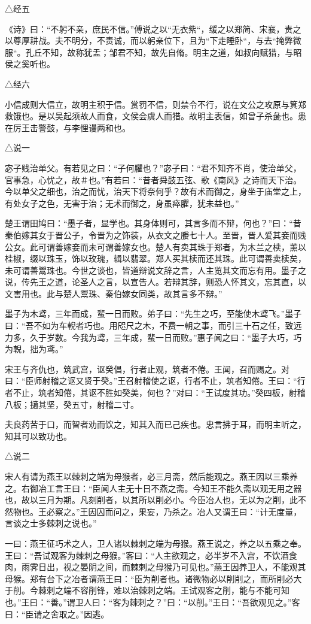 \documentclass[]{article}
\begin{document}
△经五

《诗》曰：``不躬不亲，庶民不信。''傅说之以``无衣紫``，缓之以郑简、宋襄，责之以尊厚耕战。夫不明分，不责诚，而以躬亲位下，且为``下走睡卧``，与去``掩弊微服``。孔丘不知，故称犹盂；邹君不知，故先自脩。明主之道，如叔向赋猎，与昭侯之奚听也。

△经六

小信成则大信立，故明主积于信。赏罚不信，则禁令不行，说在文公之攻原与箕郑救饿也。是以吴起须故人而食，文侯会虞人而猎。故明主表信，如曾子杀彘也。患在厉王击警鼓，与李悝谩两和也。

△说一

宓子贱治单父。有若见之曰：``子何臞也？''宓子曰：``君不知齐不肖，使治单父，官事急，心忧之，故＃也。''有若曰：``昔者舜鼓五弦、歌《南风》之诗而天下治。今以单父之细也，治之而忧，治天下将奈何乎？故有术而御之，身坐于庙堂之上，有处女子之色，无害于治；无术而御之，身虽瘁臞，犹未益也。''

楚王谓田鸠曰：``墨子者，显学也。其身体则可，其言多而不辩，何也？''曰：``昔秦伯嫁其女于晋公子，令晋为之饰装，从衣文之媵七十人。至晋，晋人爱其妾而贱公女。此可谓善嫁妾而未可谓善嫁女也。楚人有卖其珠于郑者，为木兰之椟，薰以桂椒，缀以珠玉，饰以玫瑰，辑以翡翠。郑人买其椟而还其珠。此可谓善卖椟矣，未可谓善鬻珠也。今世之谈也，皆道辩说文辞之言，人主览其文而忘有用。墨子之说，传先王之道，论圣人之言，以宣告人。若辩其辞，则恐人怀其文，忘其直，以文害用也。此与楚人鬻珠、秦伯嫁女同类，故其言多不辩。''

墨子为木鸢，三年而成，蜚一日而败。弟子曰：``先生之巧，至能使木鸢飞。''墨子曰：``吾不如为车輗者巧也。用咫尺之木，不费一朝之事，而引三十石之任，致远力多，久于岁数。今我为鸢，三年成，蜚一日而败。''惠子闻之曰：``墨子大巧，巧为輗，拙为鸢。''

宋王与齐仇也，筑武宫，讴癸倡，行者止观，筑者不倦。王闻，召而赐之。对曰：``臣师射稽之讴又贤于癸。''王召射稽使之讴，行者不止，筑者知倦。王曰：``行者不止，筑者知倦，其讴不胜如癸美，何也？''对曰：``王试度其功。''癸四板，射稽八板；擿其坚，癸五寸，射稽二寸。

夫良药苦于口，而智者劝而饮之，知其入而已己疾也。忠言拂于耳，而明主听之，知其可以致功也。

△说二

宋人有请为燕王以棘刺之端为母猴者，必三月斋，然后能观之。燕王因以三乘养之。右御冶工言王曰：``臣闻人主无十日不燕之斋。今知王不能久斋以观无用之器也，故以三月为期。凡刻削者，以其所以削必小。今臣冶人也，无以为之削，此不然物也。王必察之。''王因囚而问之，果妄，乃杀之。冶人又谓王曰：``计无度量，言谈之士多棘刺之说也。''

一曰：燕王征巧术之人，卫人诸以棘刺之端为母猴。燕王说之，养之以五乘之奉。王曰：``吾试观客为棘刺之母猴。''客曰：``人主欲观之，必半岁不入宫，不饮酒食肉，雨霁日出，视之晏阴之间，而棘刺之母猴乃可见也。''燕王因养卫人，不能观其母猴。郑有台下之冶者谓燕王曰：``臣为削者也。诸微物必以削削之，而所削必大于削。今棘刺之端不容削锋，难以治棘刺之端。王试观客之削，能与不能可知也。''王曰：``善。''谓卫人曰：``客为棘刺之？''曰：``以削。''王曰：``吾欲观见之。''客曰：``臣请之舍取之。''因逃。
\end{document}
